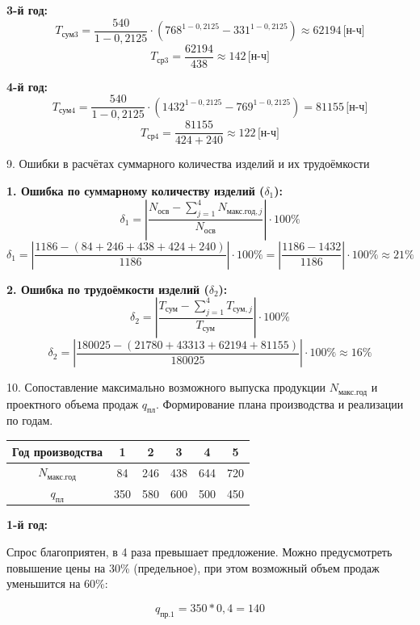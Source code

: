 \vspace{0.5cm}
\textbf{3-й год:}
\[
T_{\text{сум}3} = \frac{540}{1 - 0,2125} \cdot (768^{1 - 0,2125} - 331^{1 - 0,2125}) \approx 62194 \, \text{[н-ч]}
\]
\[
T_{\text{ср}3} = \frac{62194}{438} \approx 142 \, \text{[н-ч]}
\]

\vspace{0.5cm}
\textbf{4-й год:}
\[
T_{\text{сум}4} = \frac{540}{1 - 0,2125} \cdot (1432^{1 - 0,2125} - 769^{1 - 0,2125}) = 81155 \, \text{[н-ч]}
\]
\[
T_{\text{ср}4} = \frac{81155}{424 + 240} \approx 122 \, \text{[н-ч]}
\]

9. Ошибки в расчётах суммарного количества изделий и их трудоёмкости

\textbf{1. Ошибка по суммарному количеству изделий ($\delta_1$):}
\[
\delta_1 = \left| \frac{N_{\text{осв}} - \sum_{j=1}^{4} N_{\text{макс.год},j}}{N_{\text{осв}}} \right| \cdot 100\%
\]
\[
\delta_1 = \left| \frac{1186 - (84 + 246 + 438 + 424 + 240)}{1186} \right| \cdot 100\% = \left| \frac{1186 - 1432}{1186} \right| \cdot 100\% \approx 21\%
\]

\vspace{0.5cm}
\textbf{2. Ошибка по трудоёмкости изделий ($\delta_2$):}
\[
\delta_2 = \left| \frac{T_{\text{сум}} - \sum_{j=1}^{4} T_{\text{сум},j}}{T_{\text{сум}}} \right| \cdot 100\%
\]
\[
\delta_2 = \left| \frac{180025 - (21780 + 43313 + 62194 + 81155)}{180025} \right| \cdot 100\% \approx 16\%
\]

10. Сопоставление максимально возможного выпуска продукции $N_{\text{макс.год}}$ и проектного объема продаж $q_{\text{пл}}$. Формирование плана производства и реализации по годам.

\begin{table}
\begin{tabular}{|c|c|c|c|c|c|}
\hline
\textbf{Год производства} & \textbf{1} & \textbf{2} & \textbf{3} & \textbf{4} & \textbf{5} \\ \hline
$N_{\text{макс.год}}$ & 84 & 246 & 438 & 644 & 720 \\ \hline
$q_{\text{пл}}$ & 350 & 580 & 600 & 500 & 450 \\ \hline
\end{tabular}
\end{table}

\textbf{1-й год:}

Спрос благоприятен, в 4 раза превышает предложение. Можно предусмотреть повышение
цены на 30\% (предельное), при этом возможный объем продаж уменьшится на 60\%:

\[
q_{\text{пр.1}} = 350 * 0,4 = 140
\]

